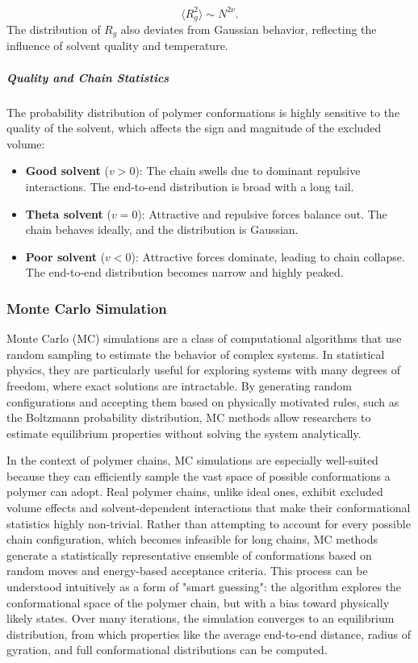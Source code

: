\documentclass{article}      %
\begin{document}
\[
\langle R_g^2 \rangle \sim N^{2\nu}.
\]
The distribution of \( R_g \) also deviates from Gaussian behavior, reflecting the influence of solvent quality and temperature.

\subparagraph{Quality and Chain Statistics}

The probability distribution of polymer conformations is highly sensitive to the quality of the solvent, which affects the sign and magnitude of the excluded volume:

\begin{itemize}
    \item \textbf{Good solvent} (\( v > 0 \)): The chain swells due to dominant repulsive interactions. The end-to-end distribution is broad with a long tail.
    \item \textbf{Theta solvent} (\( v = 0 \)): Attractive and repulsive forces balance out. The chain behaves ideally, and the distribution is Gaussian.
    \item \textbf{Poor solvent} (\( v < 0 \)): Attractive forces dominate, leading to chain collapse. The end-to-end distribution becomes narrow and highly peaked.
\end{itemize}




\subsubsection{Monte Carlo Simulation}
Monte Carlo (MC) simulations are a class of computational algorithms that use random sampling to estimate the behavior of complex systems. In statistical physics, they are particularly useful for exploring systems with many degrees of freedom, where exact solutions are intractable. By generating random configurations and accepting them based on physically motivated rules, such as the Boltzmann probability distribution, MC methods allow researchers to estimate equilibrium properties without solving the system analytically.

In the context of polymer chains, MC simulations are especially well-suited because they can efficiently sample the vast space of possible conformations a polymer can adopt. Real polymer chains, unlike ideal ones, exhibit excluded volume effects and solvent-dependent interactions that make their conformational statistics highly non-trivial. Rather than attempting to account for every possible chain configuration, which becomes infeasible for long chains, MC methods generate a statistically representative ensemble of conformations based on random moves and energy-based acceptance criteria.
This process can be understood intuitively as a form of "smart guessing": the algorithm explores the conformational space of the polymer chain, but with a bias toward physically likely states. Over many iterations, the simulation converges to an equilibrium distribution, from which properties like the average end-to-end distance, radius of gyration, and full conformational distributions can be computed.
\end{document}
